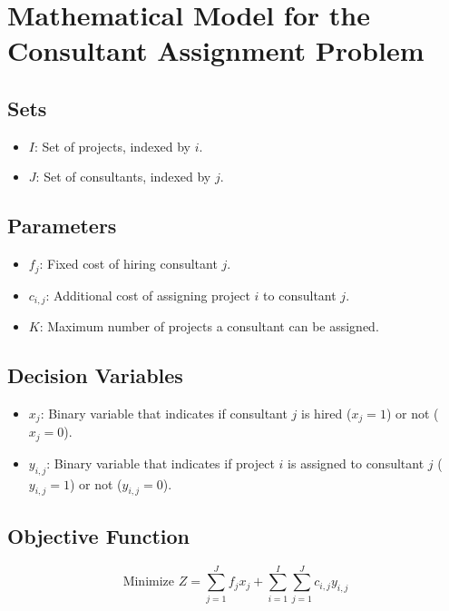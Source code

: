 \documentclass{article}
\begin{document}
\section*{Mathematical Model for the Consultant Assignment Problem}

\subsection*{Sets}
\begin{itemize}
    \item $I$: Set of projects, indexed by $i$.
    \item $J$: Set of consultants, indexed by $j$.
\end{itemize}

\subsection*{Parameters}
\begin{itemize}
    \item $f_j$: Fixed cost of hiring consultant $j$.
    \item $c_{i,j}$: Additional cost of assigning project $i$ to consultant $j$.
    \item $K$: Maximum number of projects a consultant can be assigned.
\end{itemize}

\subsection*{Decision Variables}
\begin{itemize}
    \item $x_{j}$: Binary variable that indicates if consultant $j$ is hired ($x_{j} = 1$) or not ($x_{j} = 0$).
    \item $y_{i,j}$: Binary variable that indicates if project $i$ is assigned to consultant $j$ ($y_{i,j} = 1$) or not ($y_{i,j} = 0$).
\end{itemize}

\subsection*{Objective Function}
\begin{equation}
    \text{Minimize } Z = \sum_{j=1}^{J} f_j x_j + \sum_{i=1}^{I} \sum_{j=1}^{J} c_{i,j} y_{i,j}
\end{equation}
\end{document}
